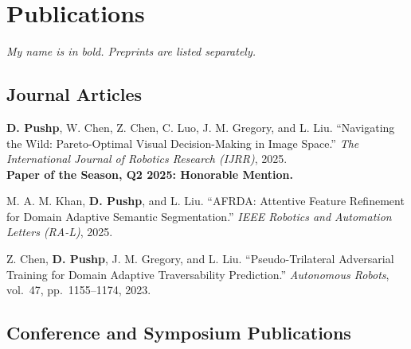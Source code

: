 \documentclass[11pt,letterpaper]{article}
\newcommand{\me}{\textbf{D. Pushp}}
\begin{document}
\newpage


\section{Publications}

\textit{My name is in bold. Preprints are listed separately.}

\subsection{Journal Articles}

\begin{enumerate}[label={[J\arabic*]}]

    \item \me, W. Chen, Z. Chen, C. Luo, J. M. Gregory,
    and L. Liu.
    ``Navigating the Wild: Pareto-Optimal Visual
    Decision-Making in Image Space.''
    \emph{The International Journal of Robotics Research
    (IJRR)}, 2025.\\
    \textbf{Paper of the Season, Q2 2025: Honorable Mention.}

    \item M. A. M. Khan, \me, and L. Liu.
    ``AFRDA: Attentive Feature Refinement for Domain
    Adaptive Semantic Segmentation.''
    \emph{IEEE Robotics and Automation Letters (RA-L)}, 2025.

    \item Z. Chen, \me, J. M. Gregory, and L. Liu.
    ``Pseudo-Trilateral Adversarial Training for Domain
    Adaptive Traversability Prediction.''
    \emph{Autonomous Robots}, vol.\ 47,
    pp.\ 1155--1174, 2023.

\end{enumerate}

\subsection{Conference and Symposium Publications}
\end{document}
